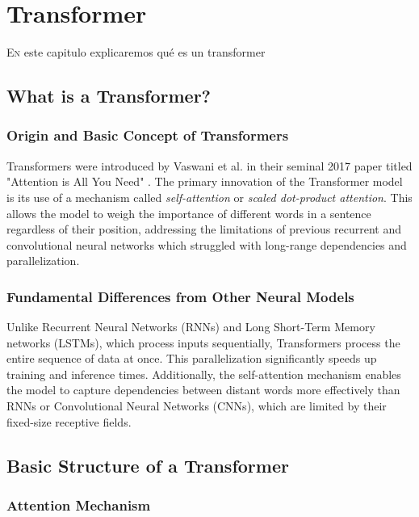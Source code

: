 \chapter{Transformer}
\pagestyle{esitscCD}

\lettrine[lraise=-0.1, lines=2, loversize=0.25]{E}n este capitulo explicaremos qué es un transformer

\section{What is a Transformer?}

\subsection{Origin and Basic Concept of Transformers}

Transformers were introduced by Vaswani et al. in their seminal 2017 paper titled "Attention is All You Need" \cite{vaswani2023attention}. The primary innovation of the Transformer model is its use of a mechanism called \textit{self-attention} or \textit{scaled dot-product attention}. This allows the model to weigh the importance of different words in a sentence regardless of their position, addressing the limitations of previous recurrent and convolutional neural networks which struggled with long-range dependencies and parallelization.

\subsection{Fundamental Differences from Other Neural Models}

Unlike Recurrent Neural Networks (RNNs) and Long Short-Term Memory networks (LSTMs), which process inputs sequentially, Transformers process the entire sequence of data at once. This parallelization significantly speeds up training and inference times. Additionally, the self-attention mechanism enables the model to capture dependencies between distant words more effectively than RNNs or Convolutional Neural Networks (CNNs), which are limited by their fixed-size receptive fields.

\section{Basic Structure of a Transformer}

\subsection{Attention Mechanism}

